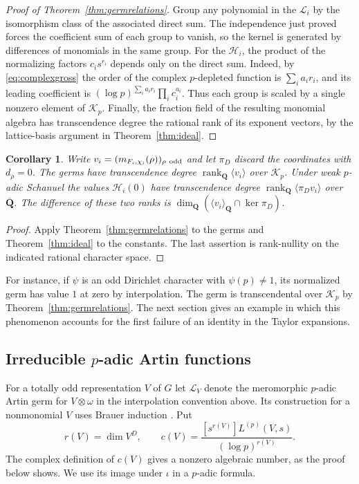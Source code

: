 \documentclass[11pt]{amsart}
\numberwithin{equation}{section}
\newtheorem{corollary}[theorem]{Corollary}
\theoremstyle{definition}
\theoremstyle{remark}
\newcommand{\Q}{\mathbf Q}
\newcommand{\Qbar}{\overline{\mathbf Q}}
\newcommand{\rank}{\operatorname{rank}}
\begin{document}
\begin{proof}[Proof of Theorem~\ref{thm:germrelations}]
Group any polynomial in the $\mathcal L_i$ by the isomorphism
class of the associated direct sum. The independence just proved
forces the coefficient sum of each group to vanish, so the kernel
is generated by differences of monomials in the same group.
For the $\mathcal H_i$, the product of the normalizing factors
$c_i s^{r_i}$ depends only on the direct sum. Indeed, by
\eqref{eq:complexgross} the order of the complex $p$-depleted
function is $\sum_i a_i r_i$, and its leading coefficient is
$(\log p)^{\sum_i a_i r_i}\prod_i c_i^{a_i}$.
Thus each group is scaled by a single nonzero element of
$\mathcal K_p$. Finally, the fraction field of the resulting
monomial algebra has transcendence degree the rational rank of its
exponent vectors, by the lattice-basis argument in
Theorem~\ref{thm:ideal}.
\end{proof}

\begin{corollary}\label{cor:loss}
Write $v_i=(m_{F_i,\chi_i}(\rho))_{\rho\ {\rm odd}}$ and let
$\pi_D$ discard the coordinates with $d_\rho=0$. The germs have
transcendence degree $\rank_\Q\langle v_i\rangle$ over $\mathcal K_p$.
Under weak $p$-adic Schanuel the values $\mathcal H_i(0)$ have
transcendence degree $\rank_\Q\langle\pi_Dv_i\rangle$ over $\Qbar$.
The difference of these two ranks is
$\dim_\Q(\langle v_i\rangle_\Q\cap\ker\pi_D)$.
\end{corollary}

\begin{proof}
Apply Theorem~\ref{thm:germrelations} to the germs and
Theorem~\ref{thm:ideal} to the constants. The last assertion is
rank-nullity on the indicated rational character space.
\end{proof}

For instance, if $\psi$ is an odd Dirichlet character with
$\psi(p)\ne1$, its normalized germ has value $1$ at zero by
interpolation. The germ is transcendental over $\mathcal K_p$
by Theorem~\ref{thm:germrelations}. The next section gives an
example in which this phenomenon accounts for the first failure
of an identity in the Taylor expansions.

\subsection{Irreducible \texorpdfstring{$p$}{p}-adic Artin functions}

For a totally odd representation $V$ of $G$ let $\mathcal L_V$ denote
the meromorphic $p$-adic Artin germ for $V\otimes\omega$ in the
interpolation convention above. Its construction for a nonmonomial
$V$ uses Brauer induction \cite{GreenbergArtin}. Put
\[
 r(V)=\dim V^D,\qquad
 c(V)=\frac{[s^{r(V)}]L^{(p)}(V,s)}{(\log p)^{r(V)}} .
\]
The complex definition of $c(V)$ gives a nonzero algebraic number,
as the proof below shows. We use its image under $\iota$ in a
$p$-adic formula.
\end{document}
